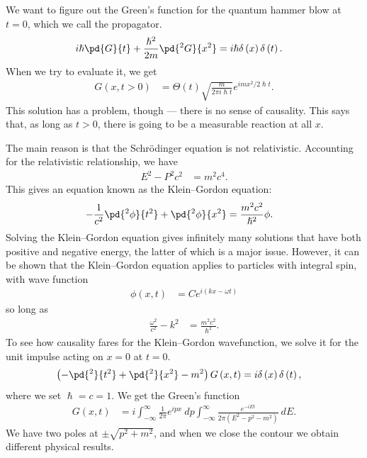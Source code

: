 \documentclass[10pt]{mypackage}
\renewcommand*{\hbar}{\hslash}
\begin{document}
  We want to figure out the Green's function for the quantum hammer blow at $t = 0$, which we call the propagator.
  \begin{align*}
    i\hbar \pd{G}{t} + \frac{\hbar^2}{2m} \pd{^2G}{x^2} &= i\hbar \delta\left( x \right)\delta\left( t \right).
  \end{align*}
  When we try to evaluate it, we get
  \begin{align*}
    G\left( x,t > 0 \right) &=  \Theta\left( t \right)\sqrt{\frac{m}{2\pi i \hbar t}} e^{imx^2/2\hbar t}.
  \end{align*}
  This solution has a problem, though --- there is no sense of causality. This says that, as long as $t > 0$, there is going to be a measurable reaction at all $x$.\newline

  The main reason is that the Schrödinger equation is not relativistic. Accounting for the relativistic relationship, we have
  \begin{align*}
    E^2 - P^2c^2 &= m^2c^4.
  \end{align*}
  This gives an equation known as the Klein--Gordon equation:
  \begin{align*}
    -\frac{1}{c^2}\pd{^2\phi}{t^2} + \pd{^2\phi}{x^2} &= \frac{m^2c^2}{\hbar^2}\phi.
  \end{align*}
  Solving the Klein--Gordon equation gives infinitely many solutions that have both positive and negative energy, the latter of which is a major issue. However, it can be shown that the Klein--Gordon equation applies to particles with integral spin, with wave function
  \begin{align*}
    \phi(x,t) &= Ce^{i\left( kx-\omega t \right)}
  \end{align*}
  so long as
  \begin{align*}
    \frac{\omega^2}{c^2} - k^2 &= \frac{m^2c^2}{\hbar^2}.
  \end{align*}
  To see how causality fares for the Klein--Gordon wavefunction, we solve it for the unit impulse acting on $x=0$ at $t = 0$.
  \begin{align*}
    \left( -\pd{^2}{t^2} + \pd{^2}{x^2} - m^2 \right) G\left( x,t \right) &= i\delta\left( x \right)\delta\left( t \right),
  \end{align*}
  where we set $\hbar = c = 1$. We get the Green's function
  \begin{align*}
    G\left( x,t \right) &= i \int_{-\infty}^{\infty} \frac{1}{2\pi}e^{ipx}\:dp\int_{-\infty}^{\infty} \frac{e^{-iEt}}{2\pi \left( E^2 - p^2 - m^2 \right)}\:dE.
  \end{align*}
  We have two poles at $\pm\sqrt{p^2 + m^2}$, and when we close the contour we obtain different physical results.\newline
\end{document}
